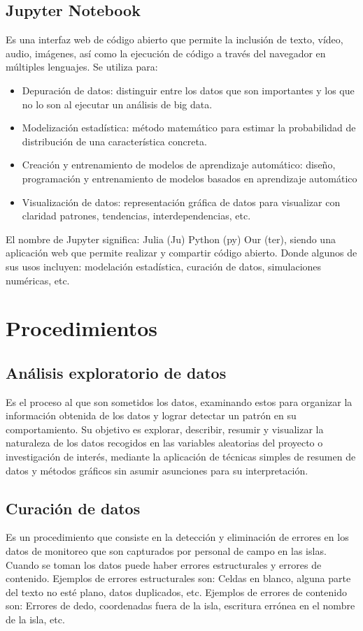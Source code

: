 \documentclass[12pt,letterpaper]{article}
\begin{document}
\subsection*{Jupyter Notebook}
Es una interfaz web de código abierto que permite la inclusión de texto, vídeo, audio, imágenes, así
como la ejecución de código a través del navegador en múltiples lenguajes. 
\citep{cabrera_diaz_jupyter}
Se utiliza para: 
\begin{itemize}
\item Depuración de datos: distinguir entre los datos que son importantes y los que no lo son al
ejecutar un análisis de big data.
\item Modelización estadística: método matemático para estimar la probabilidad de distribución de
una característica concreta.
\item Creación y entrenamiento de modelos de aprendizaje automático: diseño, programación y
entrenamiento de modelos basados en aprendizaje automático
\item Visualización de datos: representación gráfica de datos para visualizar con claridad patrones,
tendencias, interdependencias, etc.
\citep{digital_guide_ionos_jupyter}
\end{itemize}
El nombre de Jupyter significa: Julia (Ju) Python (py) Our (ter), siendo una aplicación web que permite realizar y compartir código abierto. Donde algunos de sus usos incluyen: modelación estadística, curación de datos, simulaciones numéricas, etc.

\section*{Procedimientos}
\subsection*{Análisis exploratorio de datos}
Es el proceso al que son sometidos los datos, examinando estos para organizar la información obtenida de los datos y lograr detectar un patrón en su comportamiento.
\citep{orella_analisis_exploratorio}
Su objetivo es explorar, describir, resumir y visualizar la naturaleza de los datos recogidos en las
variables aleatorias del proyecto o investigación de interés, mediante la aplicación de técnicas
simples de resumen de datos y métodos gráficos sin asumir asunciones para su interpretación.
\citep{heix_bios_analisis_exploratorio}

\subsection*{Curación de datos}
Es un procedimiento que consiste en la detección y eliminación de errores en los datos de monitoreo que son capturados por personal de campo en las islas.  Cuando se toman los datos
puede haber errores estructurales y errores de contenido.
Ejemplos de errores estructurales son: Celdas en blanco, alguna parte del texto no esté plano, datos duplicados, etc.
Ejemplos de errores de contenido son: Errores de dedo, coordenadas fuera de la isla, escritura errónea en el nombre de la isla, etc.
\end{document}
